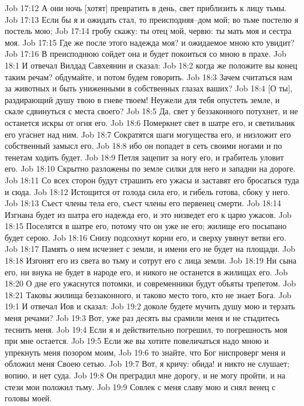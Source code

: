 Job 17:12  А они ночь [хотят] превратить в день, свет приблизить к лицу тьмы.
Job 17:13  Если бы я и ожидать стал, то преисподняя--дом мой; во тьме постелю я постель мою;
Job 17:14  гробу скажу: ты отец мой, червю: ты мать моя и сестра моя.
Job 17:15  Где же после этого надежда моя? и ожидаемое мною кто увидит?
Job 17:16  В преисподнюю сойдет она и будет покоиться со мною в прахе.
Job 18:1  И отвечал Вилдад Савхеянин и сказал:
Job 18:2  когда же положите вы конец таким речам? обдумайте, и потом будем говорить.
Job 18:3  Зачем считаться нам за животных и быть униженными в собственных глазах ваших?
Job 18:4  [О ты], раздирающий душу твою в гневе твоем! Неужели для тебя опустеть земле, и скале сдвинуться с места своего?
Job 18:5  Да, свет у беззаконного потухнет, и не останется искры от огня его.
Job 18:6  Померкнет свет в шатре его, и светильник его угаснет над ним.
Job 18:7  Сократятся шаги могущества его, и низложит его собственный замысл его,
Job 18:8  ибо он попадет в сеть своими ногами и по тенетам ходить будет.
Job 18:9  Петля зацепит за ногу его, и грабитель уловит его.
Job 18:10  Скрытно разложены по земле силки для него и западни на дороге.
Job 18:11  Со всех сторон будут страшить его ужасы и заставят его бросаться туда и сюда.
Job 18:12  Истощится от голода сила его, и гибель готова, сбоку у него.
Job 18:13  Съест члены тела его, съест члены его первенец смерти.
Job 18:14  Изгнана будет из шатра его надежда его, и это низведет его к царю ужасов.
Job 18:15  Поселятся в шатре его, потому что он уже не его; жилище его посыпано будет серою.
Job 18:16  Снизу подсохнут корни его, и сверху увянут ветви его.
Job 18:17  Память о нем исчезнет с земли, и имени его не будет на площади.
Job 18:18  Изгонят его из света во тьму и сотрут его с лица земли.
Job 18:19  Ни сына его, ни внука не будет в народе его, и никого не останется в жилищах его.
Job 18:20  О дне его ужаснутся потомки, и современники будут объяты трепетом.
Job 18:21  Таковы жилища беззаконного, и таково место того, кто не знает Бога.
Job 19:1  И отвечал Иов и сказал:
Job 19:2  доколе будете мучить душу мою и терзать меня речами?
Job 19:3  Вот, уже раз десять вы срамили меня и не стыдитесь теснить меня.
Job 19:4  Если я и действительно погрешил, то погрешность моя при мне остается.
Job 19:5  Если же вы хотите повеличаться надо мною и упрекнуть меня позором моим,
Job 19:6  то знайте, что Бог ниспроверг меня и обложил меня Своею сетью.
Job 19:7  Вот, я кричу: обида! и никто не слушает; вопию, и нет суда.
Job 19:8  Он преградил мне дорогу, и не могу пройти, и на стези мои положил тьму.
Job 19:9  Совлек с меня славу мою и снял венец с головы моей.
